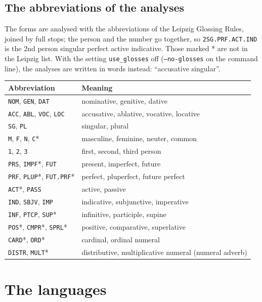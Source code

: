 \documentclass[12pt,
              article,
              oneside
              ]{memoir}
\begin{document}
\subsection{The abbreviations of the analyses}
\label{sec:glosses}

%
The forms are analysed with the abbreviations of the Leipzig Glossing
Rules, joined by full stops; the person and the number go together, so
\texttt{2SG.PRF.ACT.IND} is the 2nd person singular perfect active
indicative. Those marked * are not in the Leipzig list. With the setting
\texttt{use\_glosses} off (\texttt{--no-glosses} on the command line), the
analyses are written in words instead: \enquote{accusative singular}.

\begin{longtable}{@{}lp{}@{}}
\toprule
Abbreviation & Meaning\\
\midrule
\endhead
\texttt{NOM}, \texttt{GEN}, \texttt{DAT} & nominative, genitive, dative\\
\texttt{ACC}, \texttt{ABL}, \texttt{VOC}, \texttt{LOC} & accusative, ablative, vocative, locative\\
\texttt{SG}, \texttt{PL} & singular, plural\\
\texttt{M}, \texttt{F}, \texttt{N}, \texttt{C}* & masculine, feminine, neuter, common\\
\texttt{1}, \texttt{2}, \texttt{3} & first, second, third person\\
\texttt{PRS}, \texttt{IMPF}*, \texttt{FUT} & present, imperfect, future\\
\texttt{PRF}, \texttt{PLUP}*, \texttt{FUT.PRF}* & perfect, pluperfect, future perfect\\
\texttt{ACT}*, \texttt{PASS} & active, passive\\
\texttt{IND}, \texttt{SBJV}, \texttt{IMP} & indicative, subjunctive, imperative\\
\texttt{INF}, \texttt{PTCP}, \texttt{SUP}* & infinitive, participle, supine\\
\texttt{POS}*, \texttt{CMPR}*, \texttt{SPRL}* & positive, comparative, superlative\\
\texttt{CARD}*, \texttt{ORD}* & cardinal, ordinal numeral\\
\texttt{DISTR}, \texttt{MULT}* & distributive, multiplicative numeral (numeral adverb)\\
\bottomrule
\end{longtable}

\section{The languages}
\label{sec:languages}
\end{document}
